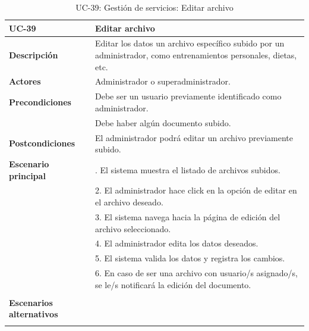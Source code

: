 \begin{table}[H]
  \begin{center}
    \begin{tabularx}{16.4cm}{|l|X|}
      \hline
      \textbf{UC-39} & \textbf{Editar archivo}\\
      \hline
      \textbf{Descripción} & Editar los datos un archivo específico subido por un administrador, como entrenamientos personales, dietas, etc. \\
      \hline
      \textbf{Actores} & Administrador o superadministrador.\\
      \hline
      \textbf{Precondiciones} & Debe ser un usuario previamente identificado como administrador.\\
      & Debe haber algún documento subido.\\
      \hline
      \textbf{Postcondiciones} & El administrador podrá editar un archivo previamente subido.\\
      \hline
      \textbf{Escenario principal} & \smallskip 1. El sistema muestra el listado de archivos subidos.\\
      & 2. El administrador hace click en la opción de editar en el archivo deseado.\\
      & 3. El sistema navega hacia la página de edición del archivo seleccionado.\\
      & 4. El administrador edita los datos deseados.\\
      & 5. El sistema valida los datos y registra los cambios.\\
      & 6. En caso de ser una archivo con usuario/s asignado/s, se le/s notificará la edición del documento.\\
      & \\
      \hline
      \textbf{Escenarios alternativos} & \\
      & \\
      \hline
    \end{tabularx}
    \caption{UC-39: Gestión de servicios: Editar archivo}
    \label{tab:CU-editar-archivo}
  \end{center}
\end{table}


